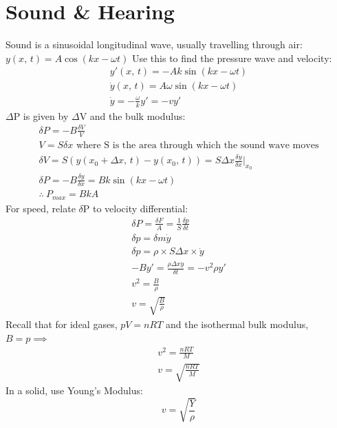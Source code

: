 \documentclass[a4paper, 11pt, fleqn, normalem]{report}
\begin{document}
\section{Sound \& Hearing}
Sound is a sinusoidal longitudinal wave, usually travelling through air: $y(x,\,t) = A\cos{(kx - \omega t)}$
Use this to find the pressure wave and velocity:
\begin{gather*}
    y'(x,\,t) = -Ak\sin{(kx - \omega t)} \\
    \dot{y}(x,\,t) = A\omega\sin{(kx - \omega t)} \\
    \dot{y} = -\frac{\omega}{k}y' = -vy'
\end{gather*}
$\Delta$P is given by $\Delta$V and the bulk modulus:
\begin{gather*}
    \delta P = -B\frac{\delta V}{V} \\
    V = S\delta x \text{ where S is the area through which the sound wave moves}\\
    \delta V = S(y(x_{0} + \Delta x,\, t) - y(x_{0},\, t)) = S\Delta x \frac{\delta y}{\delta x}\Big|_{x_{0}} \\
    \delta P = -B\frac{\delta y}{\delta x} = Bk\sin{(kx - \omega t)} \\
    \therefore~ P_{max} = BkA
\end{gather*}
For speed, relate $\delta$P to velocity differential:
\begin{gather*}
    \delta P = \frac{\delta F}{A} = \frac{1}{S}\frac{\delta p}{\delta t} \\
    \delta p = \delta m\dot{y} \\
    \delta p = \rho\times S\Delta x\times\dot{y} \\
    -By' = \frac{\rho\Delta x\dot{y}}{\delta t} = -v^{2}\rho y' \\
    v^{2} = \frac{B}{\rho} \\
    v = \sqrt{\frac{B}{\rho}}
\end{gather*}
Recall that for ideal gases, $pV = nRT$ and the isothermal bulk modulus, $B = p \implies$
\begin{gather*}
    v^{2} = \frac{nRT}{M} \\
    v = \sqrt{\frac{nRT}{M}}
\end{gather*}
In a solid, use Young's Modulus:
\begin{equation*}
    v = \sqrt{\frac{Y}{\rho}}
\end{equation*}
\end{document}
